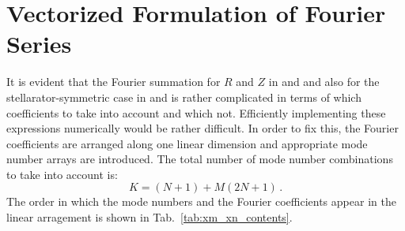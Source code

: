 \FloatBarrier
\section{Vectorized Formulation of Fourier Series} \label{sec:torcoords_numbering}
It is evident that the Fourier summation for $R$ and $Z$ in  and 
and also for the stellarator-symmetric case in  and 
is rather complicated in terms of which coefficients to take into account and which not.
Efficiently implementing these expressions numerically would be rather difficult.
In order to fix this, the Fourier coefficients are arranged along one linear dimension
and appropriate mode number arrays are introduced.
The total number of mode number combinations to take into account is:
\begin{equation}
 K = (N + 1) + M (2N + 1) \, .
\end{equation}
The order in which the mode numbers and the Fourier coefficients appear in the linear arragement is shown in Tab.~\ref{tab:xm_xn_contents}.

